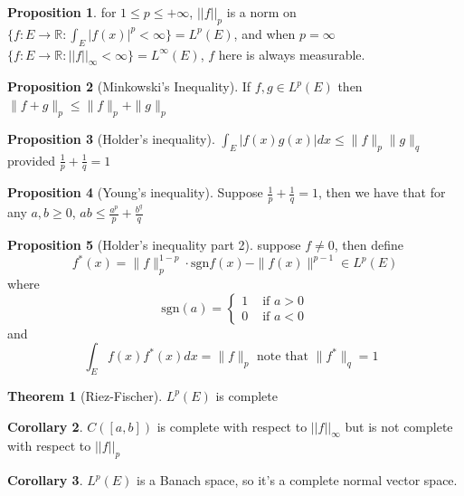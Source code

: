 \documentclass[12pt]{article}
\theoremstyle{definition}
\newtheorem{theorem}{Theorem}[section]
\newtheorem{proposition}{Proposition}[section]
\newtheorem{corollary}[theorem]{Corollary}
\begin{document}
	\begin{proposition}
		for $1 \leq p \leq +\infty$, $||f||_p$ is a norm on $\{f \colon E \to \mathbb{R} \colon \int_{E} |f(x)|^p < \infty\} = L^p (E)$, and when  $p = \infty$ $\{f \colon E \to \mathbb{R}  \colon ||f||_\infty < \infty\} = L^\infty (E)$, $f$ here is always measurable.

	\end{proposition}
	\begin{proposition}[Minkowski's Inequality]
		If $f,g \in L^p(E)$ then $\|f+g\|_p \leq \|f\|_p + \|g\|_p$
	\end{proposition}
	\begin{proposition}[Holder's inequality]
		$\int_E |f(x)g(x)|dx \leq \|f\|_p \|g\|_q $ provided $\frac{1}{p} + \frac{1}{q} = 1$
	\end{proposition}
	\begin{proposition}[Young's inequality]
		Suppose $\frac{1}{p} + \frac{1}{q} = 1$, then we have that for any $a,b \geq 0$, $ab \leq \frac{a^p}{p} + \frac{b^q}{q}$ 
	\end{proposition}
	\begin{proposition}[Holder's inequality part 2]
		suppose $f \neq 0$, then define 
		$$f^*(x) = \|f\|_p^{1-p} \cdot \text{sgn}f(x) - \|f(x)\|^{p-1} \in L^p(E)$$ 
		where 
		$$\text{sgn}(a) = 
		\begin{cases} 
		1 & \text{ if $a > 0$} \\
		0 & \text{ if $a < 0$}
		\end{cases}
		$$
		and 
		$$
			\int_E f(x)f^*(x)dx = \|f\|_p \text{ note that  $\|f^*\|_q = 1$ } 
		$$
		
																
	\end{proposition}
	\begin{theorem}[Riez-Fischer]
		\label{thm:12}
		$L^p(E)$ is complete 
	\end{theorem} 
	\begin{corollary}
		$C([a,b])$ is complete with respect to $||f||_\infty$ but is not complete with respect to $||f||_p$
	\end{corollary}
	\begin{corollary}
		$L^p(E)$ is a Banach space, so it's a complete normal vector space. 
	\end{corollary}
\end{document}
